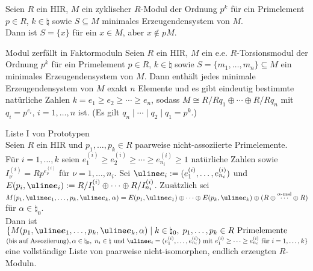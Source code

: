 \begin{Kor}
    Seien $R$ ein HIR, $M$ ein zyklischer $R$-Modul der Ordnung $p^k$ für
    ein Primelement $p \in R$, $k \in \natural$ sowie $S \subseteq M$
    minimales Erzeugendensystem von $M$. \\
    Dann ist $S = \{x\}$ für ein $x \in M$, aber $x \notin pM$.
\end{Kor}

\begin{Satz}{Modul zerfällt in Faktormoduln}
    Seien $R$ ein HIR, $M$ ein e.e. $R$-Torsionsmodul der Ordnung $p^k$ für
    ein Primelement $p \in R$, $k \in \natural$ sowie
    $S = \{m_1, \dotsc, m_n\} \subseteq M$ ein minimales
    Erzeugendensystem von $M$.
    Dann enthält jedes minimale Erzeugendensystem von $M$ exakt $n$ Elemente
    und es gibt eindeutig bestimmte natürliche Zahlen
    $k = e_1 \ge e_2 \ge \dotsb \ge e_n$, sodass
    $M \cong R/Rq_1 \oplus \dotsb \oplus R/Rq_n$ mit $q_i = p^{e_i}$,
    $i = 1, \dotsc, n$ ist.
    (Es gilt $q_n \;|\; \dotsb \;|\; q_2 \;|\; q_1 = p^k$.)
\end{Satz}

\begin{Satz}{Liste I von Prototypen} \\
    Seien $R$ ein HIR und $p_1, \dotsc, p_k \in R$ paarweise nicht-assoziierte
    Primelemente. \\
    Für $i = 1, \dotsc, k$ seien
    $e_1^{(i)} \ge e_2^{(i)} \ge \dotsb \ge e_{n_i}^{(i)} \ge 1$ natürliche
    Zahlen sowie $I_\nu^{(i)} = Rp^{e_\nu^{(i)}}$ für $\nu = 1, \dotsc, n_i$.
    Sei $\mi{e}_i := (e_1^{(i)}, \dotsc, e_{n_i}^{(i)})$ und
    $E(p_i, \mi{e}_i) := R/I_1^{(i)} \oplus \dotsb \oplus R/I_{n_i}^{(i)}$.
    Zusätzlich sei
    $M(p_1, \mi{e}_1, \dotsc, p_k, \mi{e}_k, \alpha) =
    E(p_1, \mi{e}_1) \oplus \dotsb \oplus E(p_k, \mi{e}_k) \oplus
    (R \oplus \overset{\alpha\text{-mal}}{\dotsb} \oplus R)$
    für $\alpha \in \natural_0$. \\
    Dann ist
    $\{M(p_1, \mi{e}_1, \dotsc, p_k, \mi{e}_k, \alpha) \;|\;
    k \in \natural_0,\;
    p_1, \dotsc, p_k \in R \text{ Primelemente}$\\
    $\text{(bis auf Assoziierung)},
    \alpha \in \natural_0,\;
    n_i \in \natural \text{ und }
    \mi{e}_i = (e_1^{(i)}, \dotsc, e_{n_i}^{(i)}) \text{ mit }
    e_1^{(i)} \ge \dotsb \ge e_{n_i}^{(i)} \text{ für } i = 1, \dotsc, k\}$
    eine vollständige Liste von paarweise nicht-isomorphen, endlich erzeugten
    $R$-Moduln.
\end{Satz}

